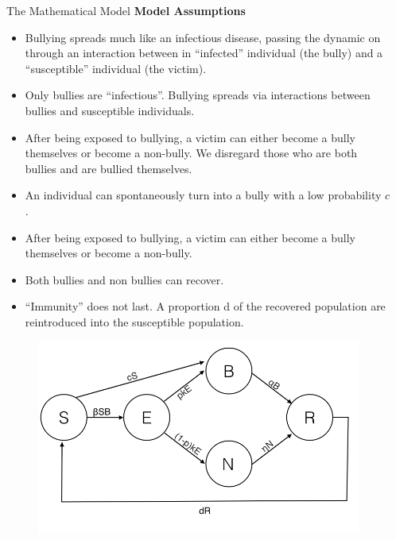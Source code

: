 \documentclass[serif,mathserif,final]{beamer}
\begin{document}
\begin{frame}{}
\begin{columns}[t]
\begin{column}{0.23\linewidth}
    \end{column}%

    \begin{column}{0.40\linewidth}

      \begin{block}{The Mathematical Model}
       \textbf{Model Assumptions} \small
\begin{itemize}
\item Bullying spreads much like an infectious disease, passing the dynamic on through an interaction between in “infected” individual (the bully) and a “susceptible” individual (the victim).
\item Only bullies are “infectious”. Bullying spreads via interactions between bullies and susceptible individuals. 
\item After being exposed to bullying, a victim can either become a bully themselves or become a non-bully. We disregard those who are both bullies and are bullied themselves.
\item An individual can spontaneously turn into a bully with a low probability $c$. 
\item After being exposed to bullying, a victim can either become a bully themselves or become a non-bully. 
\item Both bullies and non bullies can recover.
\item “Immunity” does not last. A proportion d of the recovered population are reintroduced into the susceptible population.
\end{itemize}
\begin{minipage}{.68\textwidth}
\begin{figure}[H]
\centering
\includegraphics[width=0.9\linewidth]{Compartmental_Model}
\vspace{-40pt}

\end{figure}
\end{minipage}
\end{block}
\end{column}
\end{columns}
\end{frame}
\end{document}
